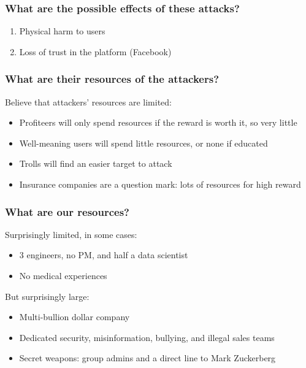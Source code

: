 \documentclass[letterpaper]{article}
\begin{document}
\subsubsection{What are the possible effects of these attacks?}
\label{sec:orgebd7893}

\begin{enumerate}
\item Physical harm to users
\item Loss of trust in the platform (Facebook)
\end{enumerate}

\subsubsection{What are their resources of the attackers?}
\label{sec:orgd52db9a}
Believe that attackers' resources are limited:

\begin{itemize}
\item Profiteers will only spend resources if the reward is worth it, so very little
\item Well-meaning users will spend little resources, or none if educated
\item Trolls will find an easier target to attack
\item Insurance companies are a question mark: lots of resources for high reward
\end{itemize}

\subsubsection{What are our resources?}
\label{sec:org72a878f}
Surprisingly limited, in some cases:

\begin{itemize}
\item 3 engineers, no PM, and half a data scientist
\item No medical experiences
\end{itemize}

But surprisingly large:

\begin{itemize}
\item Multi-bullion dollar company
\item Dedicated security, misinformation, bullying, and illegal sales teams
\item Secret weapons: group admins and a direct line to Mark Zuckerberg
\end{itemize}
\end{document}
